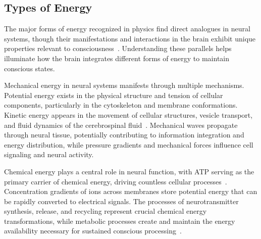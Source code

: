 \subsection*{Types of Energy~}

The major forms of energy recognized in physics find direct analogues in neural systems, though their manifestations and interactions in the brain exhibit unique properties relevant to consciousness~\cite{attwell2001}. Understanding these parallels helps illuminate how the brain integrates different forms of energy to maintain conscious states.

Mechanical energy in neural systems manifests through multiple mechanisms. Potential energy exists in the physical structure and tension of cellular components, particularly in the cytoskeleton and membrane conformations. Kinetic energy appears in the movement of cellular structures, vesicle transport, and fluid dynamics of the cerebrospinal fluid~\cite{faisal2008}. Mechanical waves propagate through neural tissue, potentially contributing to information integration and energy distribution, while pressure gradients and mechanical forces influence cell signaling and neural activity.

Chemical energy plays a central role in neural function, with ATP serving as the primary carrier of chemical energy, driving countless cellular processes~\cite{pellerin2004neuroenergetics}. Concentration gradients of ions across membranes store potential energy that can be rapidly converted to electrical signals. The processes of neurotransmitter synthesis, release, and recycling represent crucial chemical energy transformations, while metabolic processes create and maintain the energy availability necessary for sustained conscious processing~\cite{laughlin2001}.

